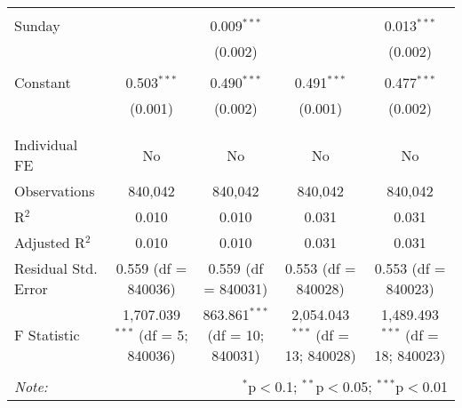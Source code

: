 \documentclass[
]{article}
\begin{document}
\begin{table}[!htbp]
{\begin{tabular}{@{\extracolsep{5pt}}lcccc}
  & & & & \\ 
 Sunday &  & 0.009$^{***}$ &  & 0.013$^{***}$ \\ 
  &  & (0.002) &  & (0.002) \\ 
  & & & & \\ 
 Constant & 0.503$^{***}$ & 0.490$^{***}$ & 0.491$^{***}$ & 0.477$^{***}$ \\ 
  & (0.001) & (0.002) & (0.001) & (0.002) \\ 
  & & & & \\ 
\hline \\[-1.8ex] 
Individual FE & No & No & No & No \\ 
Observations & 840,042 & 840,042 & 840,042 & 840,042 \\ 
R$^{2}$ & 0.010 & 0.010 & 0.031 & 0.031 \\ 
Adjusted R$^{2}$ & 0.010 & 0.010 & 0.031 & 0.031 \\ 
Residual Std. Error & 0.559 (df = 840036) & 0.559 (df = 840031) & 0.553 (df = 840028) & 0.553 (df = 840023) \\ 
F Statistic & 1,707.039$^{***}$ (df = 5; 840036) & 863.861$^{***}$ (df = 10; 840031) & 2,054.043$^{***}$ (df = 13; 840028) & 1,489.493$^{***}$ (df = 18; 840023) \\ 
\hline 
\hline \\[-1.8ex] 
\textit{Note:}  & \multicolumn{4}{r}{$^{*}$p$<$0.1; $^{**}$p$<$0.05; $^{***}$p$<$0.01} \\ 
\end{tabular}
} 
\end{table} 
\newpage
\end{document}
